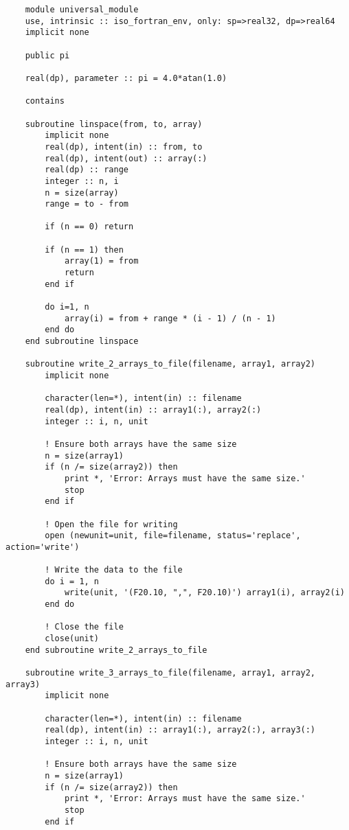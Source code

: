 \begin{verbatim}
    module universal_module
    use, intrinsic :: iso_fortran_env, only: sp=>real32, dp=>real64
    implicit none

    public pi

    real(dp), parameter :: pi = 4.0*atan(1.0)

    contains

    subroutine linspace(from, to, array)
        implicit none
        real(dp), intent(in) :: from, to
        real(dp), intent(out) :: array(:)
        real(dp) :: range
        integer :: n, i
        n = size(array)
        range = to - from
    
        if (n == 0) return
    
        if (n == 1) then
            array(1) = from
            return
        end if
        
        do i=1, n
            array(i) = from + range * (i - 1) / (n - 1)
        end do
    end subroutine linspace

    subroutine write_2_arrays_to_file(filename, array1, array2)
        implicit none

        character(len=*), intent(in) :: filename
        real(dp), intent(in) :: array1(:), array2(:)
        integer :: i, n, unit
    
        ! Ensure both arrays have the same size
        n = size(array1)
        if (n /= size(array2)) then
            print *, 'Error: Arrays must have the same size.'
            stop
        end if
    
        ! Open the file for writing
        open (newunit=unit, file=filename, status='replace', action='write')
    
        ! Write the data to the file
        do i = 1, n
            write(unit, '(F20.10, ",", F20.10)') array1(i), array2(i)
        end do
    
        ! Close the file
        close(unit)
    end subroutine write_2_arrays_to_file

    subroutine write_3_arrays_to_file(filename, array1, array2, array3)
        implicit none

        character(len=*), intent(in) :: filename
        real(dp), intent(in) :: array1(:), array2(:), array3(:)
        integer :: i, n, unit
    
        ! Ensure both arrays have the same size
        n = size(array1)
        if (n /= size(array2)) then
            print *, 'Error: Arrays must have the same size.'
            stop
        end if
    

\end{verbatim}

